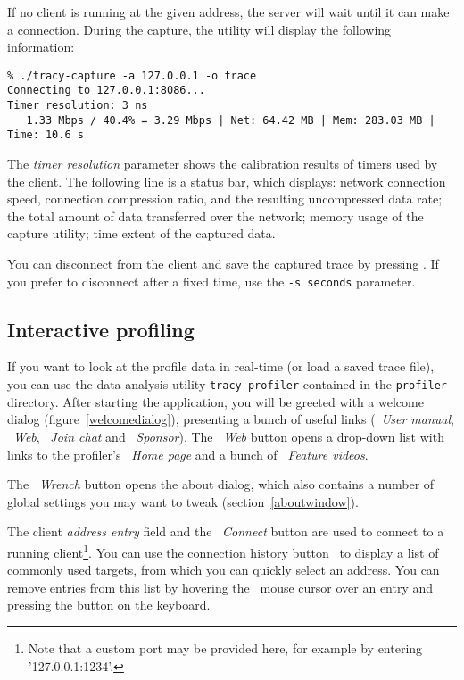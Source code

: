 \documentclass[hidelinks,titlepage,a4paper,twoside]{article}
\begin{document}
If no client is running at the given address, the server will wait until it can make a connection. During the capture, the utility will display the following information:

\begin{verbatim}
% ./tracy-capture -a 127.0.0.1 -o trace
Connecting to 127.0.0.1:8086...
Timer resolution: 3 ns
   1.33 Mbps / 40.4% = 3.29 Mbps | Net: 64.42 MB | Mem: 283.03 MB | Time: 10.6 s
\end{verbatim}

The \emph{timer resolution} parameter shows the calibration results of timers used by the client. The following line is a status bar, which displays: network connection speed, connection compression ratio, and the resulting uncompressed data rate; the total amount of data transferred over the network; memory usage of the capture utility; time extent of the captured data.

You can disconnect from the client and save the captured trace by pressing . If you prefer to disconnect after a fixed time, use the \texttt{-s seconds} parameter.

\subsection{Interactive profiling}
\label{interactiveprofiling}

If you want to look at the profile data in real-time (or load a saved trace file), you can use the data analysis utility \texttt{tracy-profiler} contained in the \texttt{profiler} directory. After starting the application, you will be greeted with a welcome dialog (figure~\ref{welcomedialog}), presenting a bunch of useful links (\faBook{}~\emph{User manual}, \faGlobeAmericas{}~\emph{Web}, \faComment~\emph{Join chat} and \faHeart{}~\emph{Sponsor}). The \faGlobeAmericas{}~\emph{Web} button opens a drop-down list with links to the profiler's \emph{\faHome{}~Home page} and a bunch of \emph{\faVideo{}~Feature videos}.

The \emph{\faWrench{}~Wrench} button opens the about dialog, which also contains a number of global settings you may want to tweak (section~\ref{aboutwindow}).

The client \emph{address entry} field and the \faWifi{}~\emph{Connect} button are used to connect to a running client\footnote{Note that a custom port may be provided here, for example by entering '127.0.0.1:1234'.}. You can use the connection history button~\faCaretDown{} to display a list of commonly used targets, from which you can quickly select an address. You can remove entries from this list by hovering the \faMousePointer{}~mouse cursor over an entry and pressing the \keys{\del} button on the keyboard.
\end{document}
